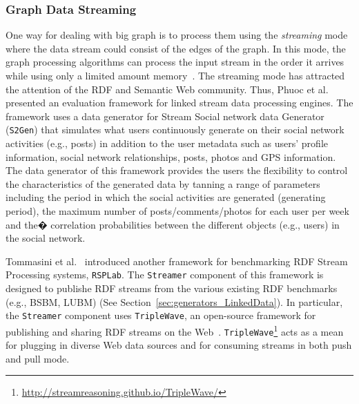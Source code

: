 \subsubsection{Graph Data Streaming}
\label{sec:generators_streaming}
One way for dealing with big graph is to process them using the \emph{streaming} mode where the data stream could consist of the edges of the graph. In this mode, the graph processing algorithms can process the input stream in the order it arrives while using only a limited amount memory~\cite{mcgregor2014graph}. The streaming mode has attracted the attention of the RDF and Semantic Web community. Thus, Phuoc et al.~\cite{le2012linked} presented an evaluation framework for linked stream data processing engines. The framework uses a data generator for Stream Social network data Generator (\texttt{S2Gen}) that simulates what users continuously generate on their social network activities (e.g., posts) in addition to the  user metadata such as users' profile information, social network relationships, posts, photos and GPS information. The data generator of this framework provides the users the flexibility to control the characteristics of the generated data by tanning a range of parameters including the period in which the social activities are generated (generating period), the maximum number of posts/comments/photos for each user per week and the� correlation probabilities between the different objects (e.g., users) in the social network.

Tommasini et al.~\cite{tommasini2017rsplab} introduced another framework for benchmarking RDF Stream Processing systems, \texttt{RSPLab}. The \texttt{Streamer} component of this framework is designed to publishe RDF streams from the various existing RDF benchmarks (e.g., BSBM, LUBM) (See Section~\ref{sec:generators_LinkedData}). In particular, the \texttt{Streamer}  component uses \texttt{TripleWave}, an open-source framework for publishing
and sharing RDF streams on the Web~\cite{mauri2016triplewave}.   \texttt{TripleWave}\footnote{\url{http://streamreasoning.github.io/TripleWave/}} acts as a mean for plugging in diverse Web data sources and for consuming streams in both push and pull mode.

